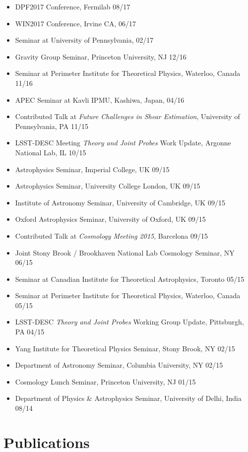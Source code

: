 \documentclass[10pt,margin]{res}
\begin{document}
\begin{resume}
\begin{itemize}
\item DPF2017 Conference, Fermilab 08/17
\item WIN2017 Conference, Irvine CA, 06/17
\item Seminar at University of Pennsylvania, 02/17
\item Gravity Group Seminar, Princeton University, NJ 12/16
\item Seminar at Perimeter Institute for Theoretical Physics, Waterloo, Canada 11/16
\item APEC Seminar at Kavli IPMU, Kashiwa, Japan, 04/16
\item Contributed Talk at {\sl Future Challenges in Shear Estimation}, University of Pennsylvania, PA 11/15
\item LSST-DESC Meeting {\sl Theory and Joint Probes} Work Update, Argonne National Lab, IL 10/15
\item Astrophysics Seminar, Imperial College, UK 09/15
\item Astrophysics Seminar, University College London, UK 09/15
\item Institute of Astronomy Seminar, University of Cambridge, UK 09/15
\item Oxford Astrophysics Seminar, University of Oxford, UK 09/15
\item Contributed Talk at {\sl Cosmology Meeting 2015}, Barcelona 09/15
\item Joint Stony Brook / Brookhaven National Lab Cosmology Seminar, NY 06/15
\item Seminar at Canadian Institute for Theoretical Astrophysics, Toronto 05/15
\item Seminar at Perimeter Institute for Theoretical Physics, Waterloo, Canada 05/15
\item LSST-DESC {\sl Theory and Joint Probes} Working Group Update, Pittsburgh, PA 04/15
\item Yang Institute for Theoretical Physics Seminar, Stony Brook, NY 02/15
\item Department of Astronomy Seminar, Columbia University, NY 02/15
\item Cosmology Lunch Seminar, Princeton University, NJ 01/15
\item Department of Physics \& Astrophysics Seminar, University of Delhi, India 08/14
\end{itemize}

\section{Publications}


\end{resume}
\end{document}
